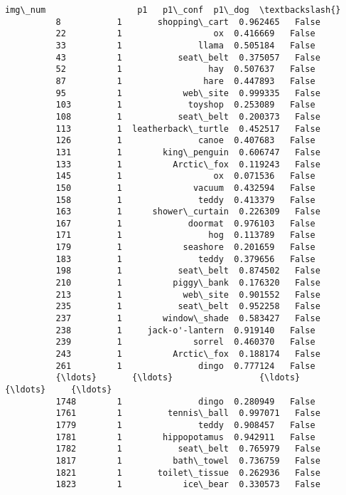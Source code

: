 \documentclass[11pt]{article}
\begin{document}
\begin{Verbatim}[commandchars=\\\{\}]
                img\_num                  p1   p1\_conf  p1\_dog  \textbackslash{}
          8           1       shopping\_cart  0.962465   False   
          22          1                  ox  0.416669   False   
          33          1               llama  0.505184   False   
          43          1           seat\_belt  0.375057   False   
          52          1                 hay  0.507637   False   
          87          1                hare  0.447893   False   
          95          1            web\_site  0.999335   False   
          103         1             toyshop  0.253089   False   
          108         1           seat\_belt  0.200373   False   
          113         1  leatherback\_turtle  0.452517   False   
          126         1               canoe  0.407683   False   
          131         1        king\_penguin  0.606747   False   
          133         1          Arctic\_fox  0.119243   False   
          145         1                  ox  0.071536   False   
          150         1              vacuum  0.432594   False   
          158         1               teddy  0.413379   False   
          163         1      shower\_curtain  0.226309   False   
          167         1             doormat  0.976103   False   
          171         1                 hog  0.113789   False   
          179         1            seashore  0.201659   False   
          183         1               teddy  0.379656   False   
          198         1           seat\_belt  0.874502   False   
          210         1          piggy\_bank  0.176320   False   
          213         1            web\_site  0.901552   False   
          235         1           seat\_belt  0.952258   False   
          237         1        window\_shade  0.583427   False   
          238         1     jack-o'-lantern  0.919140   False   
          239         1              sorrel  0.460370   False   
          243         1          Arctic\_fox  0.188174   False   
          261         1               dingo  0.777124   False   
          {\ldots}       {\ldots}                 {\ldots}       {\ldots}     {\ldots}   
          1748        1               dingo  0.280949   False   
          1761        1         tennis\_ball  0.997071   False   
          1779        1               teddy  0.908457   False   
          1781        1        hippopotamus  0.942911   False   
          1782        1           seat\_belt  0.765979   False   
          1817        1          bath\_towel  0.736759   False   
          1821        1       toilet\_tissue  0.262936   False   
          1823        1            ice\_bear  0.330573   False   

\end{Verbatim}
\end{document}
